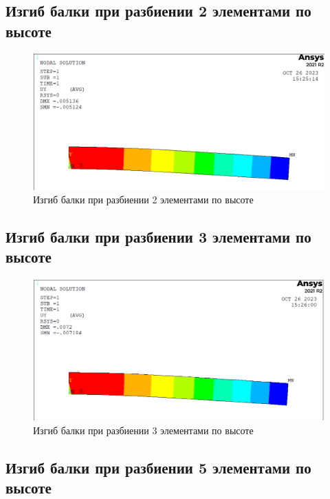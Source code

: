 \documentclass[12pt,a4paper]{article}
\begin{document}
    \pagebreak
    
    \subsection{ Изгиб балки при разбиении 2 элементами по высоте }
    
    \begin{figure}[h]
    	\centering
    	\includegraphics[width=1\textwidth]{p2.PNG}
    	\caption{Изгиб балки при разбиении 2 элементами по высоте}
    \end{figure}

\pagebreak

\subsection{ Изгиб балки при разбиении 3 элементами по высоте }

\begin{figure}[h]
	\centering
	\includegraphics[width=1\textwidth]{p3.PNG}
	\caption{Изгиб балки при разбиении 3 элементами по высоте}
\end{figure}

\pagebreak

\subsection{ Изгиб балки при разбиении 5 элементами по высоте }
\end{document}

